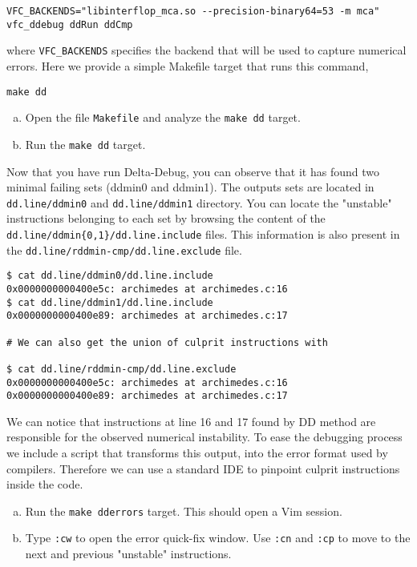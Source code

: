 \begin{verbatim}
VFC_BACKENDS="libinterflop_mca.so --precision-binary64=53 -m mca" vfc_ddebug ddRun ddCmp
\end{verbatim}

where \texttt{VFC\_BACKENDS} specifies the backend that will be used to
capture numerical errors. Here we provide a simple Makefile target that
runs this command,
\begin{verbatim}
make dd
\end{verbatim}

\begin{question}
  \begin{enumerate}[(a)]
    \item Open the file \texttt{Makefile} and analyze the \texttt{make dd} target.
    \item Run the \texttt{make dd} target.
  \end{enumerate}
\end{question}

Now that you have run Delta-Debug, you can observe that it has found two minimal
failing sets (ddmin0 and ddmin1). The outputs sets are located in
\texttt{dd.line/ddmin0} and \texttt{dd.line/ddmin1} directory. You can locate
the "unstable" instructions belonging to each set by browsing the content of the
\texttt{dd.line/ddmin\{0,1\}/dd.line.include} files. This information is also
present in the \texttt{dd.line/rddmin-cmp/dd.line.exclude} file.

\begin{verbatim}
$ cat dd.line/ddmin0/dd.line.include
0x0000000000400e5c: archimedes at archimedes.c:16
$ cat dd.line/ddmin1/dd.line.include
0x0000000000400e89: archimedes at archimedes.c:17

# We can also get the union of culprit instructions with

$ cat dd.line/rddmin-cmp/dd.line.exclude
0x0000000000400e5c: archimedes at archimedes.c:16
0x0000000000400e89: archimedes at archimedes.c:17
\end{verbatim}

We can notice that instructions at line 16 and 17 found by DD method are responsible for the observed numerical instability. To ease the debugging process we include a script that transforms this output, into the error format used by compilers. Therefore we can use a standard IDE to pinpoint culprit instructions inside the code.

\begin{question}
  \begin{enumerate}[(a)]
    \item Run the \texttt{make dderrors} target. This should open a Vim session.
    \item Type \texttt{:cw} to open the error quick-fix window. Use \texttt{:cn} and \texttt{:cp} to move to the next and previous "unstable" instructions.
  \end{enumerate}
\end{question}

